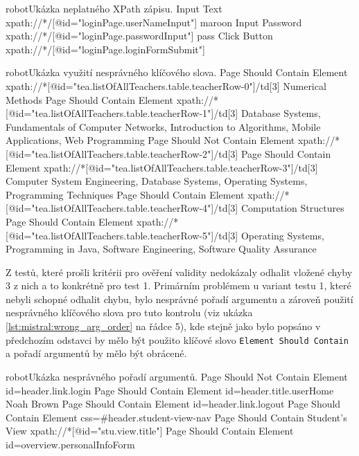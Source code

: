 \documentclass[czech, ma, kiv, he, iso690numb, pdf, viewonly]{fasthesis}
\begin{document}
        \begin{code}{robot}{Ukázka neplatného XPath zápisu. \label{lst:mistral:wrong_xpath}}
Input Text    xpath://*/[@id="loginPage.userNameInput"]    maroon
Input Password    xpath://*/[@id="loginPage.passwordInput"]    pass
Click Button    xpath://*/[@id="loginPage.loginFormSubmit"]
        \end{code}

        \begin{code}{robot}{Ukázka využití nesprávného klíčového slova. \label{lst:mistral:incorrect_keyword}}
Page Should Contain Element    xpath://*[@id="tea.listOfAllTeachers.table.teacherRow-0"]/td[3]    Numerical Methods
Page Should Contain Element    xpath://*[@id="tea.listOfAllTeachers.table.teacherRow-1"]/td[3]    Database Systems, Fundamentals of Computer Networks, Introduction to Algorithms, Mobile Applications, Web Programming
Page Should Not Contain Element    xpath://*[@id="tea.listOfAllTeachers.table.teacherRow-2"]/td[3]
Page Should Contain Element    xpath://*[@id="tea.listOfAllTeachers.table.teacherRow-3"]/td[3]    Computer System Engineering, Database Systems, Operating Systems, Programming Techniques
Page Should Contain Element    xpath://*[@id="tea.listOfAllTeachers.table.teacherRow-4"]/td[3]    Computation Structures
Page Should Contain Element    xpath://*[@id="tea.listOfAllTeachers.table.teacherRow-5"]/td[3]    Operating Systems, Programming in Java, Software Engineering, Software Quality Assurance
        \end{code}

        \noindent Z testů, které prošli kritérii pro ověření validity nedokázaly odhalit vložené chyby 3 z nich a to konkrétně pro test 1. Primárním problémem u variant testu 1, které nebyli schopné odhalit chybu, bylo nesprávné pořadí argumentu a zároveň použití nesprávného klíčového slova pro tuto kontrolu (viz ukázka \ref{lst:mistral:wrong_arg_order} na řádce 5), kde stejně jako bylo popsáno v předchozím odstavci by mělo být použito klíčové slovo \verb|Element Should Contain| a pořadí argumentů by mělo být obrácené.

        \begin{code}{robot}{Ukázka nesprávného pořadí argumentů. \label{lst:mistral:wrong_arg_order}}
Page Should Not Contain Element    id=header.link.login
Page Should Contain Element    id=header.title.userHome    Noah Brown
Page Should Contain Element    id=header.link.logout
Page Should Contain Element    css=#header.student-view-nav
Page Should Contain    Student's View    xpath://*[@id="stu.view.title"]
Page Should Contain Element    id=overview.personalInfoForm
        \end{code}
\end{document}
